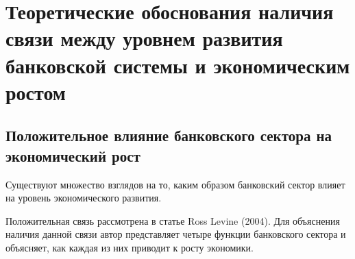 	
	\chapter{Теоретические обоснования наличия связи между уровнем развития банковской системы и экономическим ростом}
	\section{Положительное влияние банковского сектора на экономический рост}

Существуют множество взглядов на то, каким образом банковский сектор влияет на уровень экономического развития. 

Положительная связь рассмотрена в статье Ross Levine (2004).  Для объяснения наличия данной связи автор представляет четыре функции банковского сектора и объясняет, как каждая из них приводит к росту экономики.
